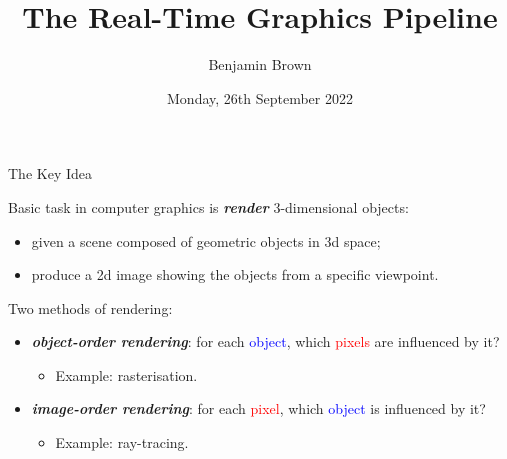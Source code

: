 \documentclass{beamer}
\title[Graphics Pipeline]{The Real-Time Graphics Pipeline}
\author{Benjamin Brown}
\date{Monday, 26th September 2022}
\newcommand{\emphbf}[1]{\textbf{\emph{#1}}}
\begin{document}
\begin{frame}
  \titlepage
\end{frame}


\begin{frame}{The Key Idea}

Basic task in computer graphics is \emphbf{render} 3-dimensional objects:

\begin{itemize}
  \item given a scene composed of geometric objects in 3d space;
  \item produce a 2d image showing the objects from a specific viewpoint.
\end{itemize}

\vskip 1cm

Two methods of rendering:

\begin{itemize}
	\item \emphbf{object-order rendering}: for each \textcolor{blue}{object}, which \textcolor{red}{pixels} are influenced by it?
		\begin{itemize}
			\item Example: rasterisation.
		\end{itemize}
	\item \emphbf{image-order rendering}: for each \textcolor{red}{pixel}, which \textcolor{blue}{object} is influenced by it?
		\begin{itemize}
			\item Example: ray-tracing.
		\end{itemize}
\end{itemize}

\end{frame}
\end{document}
